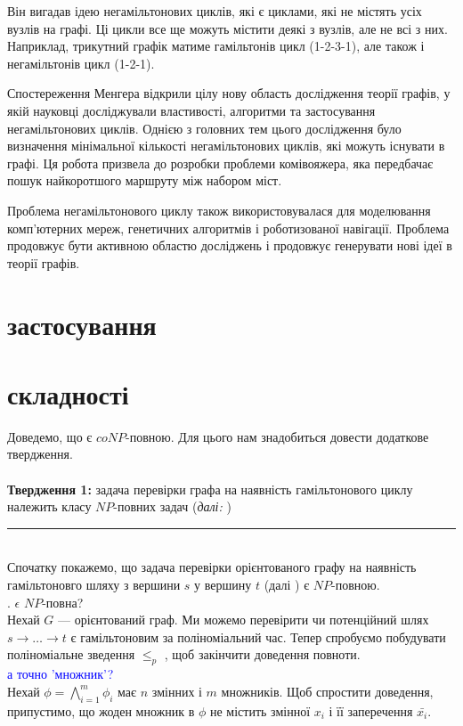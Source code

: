 \documentclass[14pt]{article}
\begin{document}
\begin{spacing}{1.175}
        Він вигадав ідею негамільтонових циклів, які є циклами, які не містять усіх вузлів на графі. Ці цикли все ще можуть містити деякі з вузлів, але не всі з них. Наприклад, трикутний графік матиме гамільтонів цикл (1-2-3-1), але також і негамільтонів цикл (1-2-1).

        Спостереження Менгера відкрили цілу нову область дослідження теорії графів, у якій науковці досліджували властивості, алгоритми та застосування негамільтонових циклів. Однією з головних тем цього дослідження було визначення мінімальної кількості негамільтонових циклів, які можуть існувати в графі. Ця робота призвела до розробки проблеми комівояжера, яка передбачає пошук найкоротшого маршруту між набором міст.

        Проблема негамільтонового циклу також використовувалася для моделювання комп’ютерних мереж, генетичних алгоритмів і роботизованої навігації. Проблема продовжує бути активною областю досліджень і продовжує генерувати нові ідеї в теорії графів.
    
    \section{ застосування}

    
    
    \section{ складності}
    \quad Доведемо, що \nonhamcycle є \(coNP\)-повною. Для цього нам знадобиться довести додаткове твердження. \\\\
    \textbf{Твердження 1:} задача перевірки графа на наявність гамільтонового циклу належить класу \(NP\)-повних задач (\textit{далі:} \hamcycle)\\
    \rule{0.7em}{0.7em}\\
    Спочатку покажемо, що задача перевірки орієнтованого графу на наявність гамільтоновго шляху з вершини \(s\) у вершину \(t\) (далі \dhampath)  є \(NP\)-повною.
    \\ 
    
    . \dhampath \(\epsilon\) \(NP\)-повна?\\
    Нехай \(G\) — орієнтований граф. Ми можемо перевірити чи потенційний шлях \(s \to \dots \to t\) є гамільтоновим за поліноміальний час. Тепер спробуємо побудувати поліноміальне зведення \tsat \(\le_p\) \dhampath, щоб закінчити доведення повноти.
    \\
    \textcolor{blue}{а точно 'множник'?}\\
    Нехай \(\phi = \bigwedge_{i=1}^{m} \phi_{i}\) має \(n\) змінних і \(m\) множників. Щоб спростити доведення, припустимо, що жоден множник в \(\phi\) не містить змінної \(x_i\) і її заперечення \(\bar{x_i}\).  
    

\end{spacing}
\end{document}
